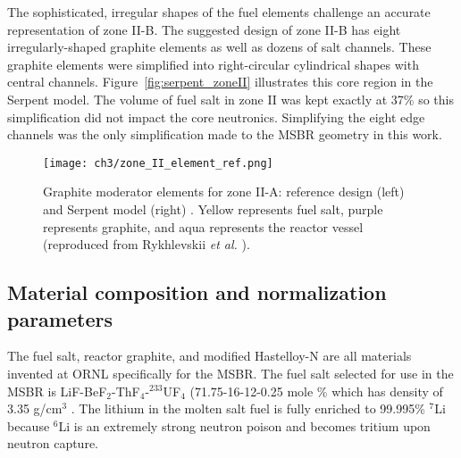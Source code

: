 The sophisticated, irregular shapes of the fuel elements challenge an accurate 
representation of zone II-B. The suggested design 
\cite{robertson_conceptual_1971} of zone II-B has eight irregularly-shaped 
graphite elements as well as dozens of salt channels. These graphite elements 
were simplified into right-circular cylindrical shapes with central channels. 
Figure~\ref{fig:serpent_zoneII} illustrates this core region in the Serpent 
model. The volume of fuel salt in zone II was kept exactly at 37\% so 
this simplification did not impact the core neutronics. 
Simplifying the eight edge channels was the only simplification made to the 
\gls{MSBR} geometry in this work. 
\begin{figure}[ht!] %
	\texttt{[image: ch3/zone\_II\_element\_ref.png]}
	\caption{Graphite moderator elements for zone II-A: reference design (left)
		\cite{robertson_conceptual_1971} and Serpent model (right) 
		\cite{rykhlevskii_full-core_2017}.  Yellow 
		represents fuel salt, purple represents graphite, and aqua represents 
		the reactor vessel (reproduced from Rykhlevskii \emph{et al.} 
		\cite{rykhlevskii_modeling_2019}).}
	\label{fig:II_element_ref}
\end{figure}

\subsection{Material composition and normalization parameters}
The fuel salt, reactor graphite, and modified Hastelloy-N are all materials 
invented at \gls{ORNL} specifically for the \gls{MSBR}. The fuel salt selected 
for use in the \gls{MSBR} is LiF-BeF$_2$-ThF$_4$-$^{233}$UF$_4$ 
(71.75-16-12-0.25 mole \% which has density of 3.35 g/cm$^3$ 
\cite{robertson_conceptual_1971}. The lithium in the molten salt fuel is fully 
enriched to 99.995\% $^{7}$Li because $^{6}$Li is an extremely strong neutron 
poison and becomes tritium upon neutron capture. 

